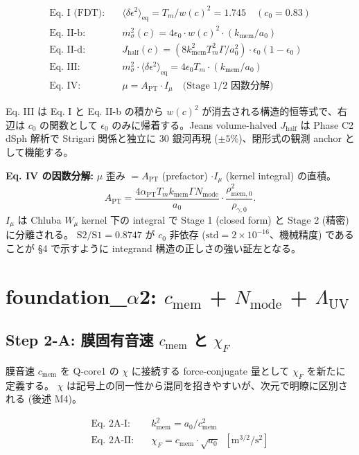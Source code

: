 \documentclass[11pt,a4paper]{ltjsarticle}
\newcommand{\epso}{\epsilon_0}
\newcommand{\kmem}{k_{\mathrm{mem}}}
\newcommand{\cmem}{c_{\mathrm{mem}}}
\newcommand{\Tm}{T_{m}}
\newcommand{\Nmode}{N_{\mathrm{mode}}}
\newcommand{\aPT}{\alpha_{\mathrm{PT}}}
\newcommand{\rhomem}{\rho_{\mathrm{mem},0}}
\newcommand{\rhog}{\rho_{\gamma,0}}
\newcommand{\Imu}{I_{\mu}}
\newcommand{\Wmu}{W_{\mu}}
\newcommand{\APT}{A_{\mathrm{PT}}}
\newcommand{\Lambdauv}{\Lambda_{\mathrm{UV}}}
\newcommand{\msigma}{m_{\sigma}}
\newcommand{\Jhalf}{J_{\mathrm{half}}}
\begin{document}
\begin{keybox}
\begin{align*}
\text{Eq. I (FDT):}\quad &\langle \delta\epsilon^2 \rangle_{\mathrm{eq}} = \Tm / w(c)^2 = 1.745 \quad (c_0 = 0.83) \\
\text{Eq. II-b:}\quad &\msigma^2(c) = 4\epso \cdot w(c)^2 \cdot (\kmem / a_0) \\
\text{Eq. II-d:}\quad &\Jhalf(c) = (8\kmem^2 \Tm^2 \Gamma / a_0^2) \cdot \epso(1 - \epso) \\
\text{Eq. III:}\quad &\msigma^2 \cdot \langle \delta\epsilon^2 \rangle_{\mathrm{eq}} = 4\epso\Tm \cdot (\kmem / a_0) \\
\text{Eq. IV:}\quad &\mu = \APT \cdot \Imu \quad \text{(Stage 1/2 因数分解)}
\end{align*}
\end{keybox}

Eq. III は Eq. I と Eq. II-b の積から $w(c)^2$ が消去される構造的恒等式で、右辺は $c_0$ の関数として
$\epso$ のみに帰着する。Jeans volume-halved $\Jhalf$ は Phase C2 dSph 解析で Strigari 関係と独立に
30 銀河再現 ($\pm 5\%$)、閉形式の観測 anchor として機能する。

\medskip\noindent
\textbf{Eq. IV の因数分解:}
$\mu$ 歪み $= \APT$ (prefactor) $\cdot \Imu$ (kernel integral) の直積。
\[
\APT = \frac{4\aPT \Tm \kmem \Gamma \Nmode}{a_0} \cdot \frac{\rhomem^2}{\rhog}.
\]
$\Imu$ は Chluba $\Wmu$ kernel 下の integral で Stage 1 (closed form) と Stage 2 (精密) に分離される。
$\mathrm{S2/S1} = 0.8747$ が $c_0$ 非依存 ($\mathrm{std} = 2 \times 10^{-16}$、機械精度) であることが
\S 4 で示すように integrand 構造の正しさの強い証左となる。

\section{foundation\_$\alpha$2: $\cmem$ + $\Nmode$ + $\Lambdauv$}

\subsection{Step 2-A: 膜固有音速 $\cmem$ と $\chi_F$}
膜音速 $\cmem$ を Q-core1 の $\chi$ に接続する force-conjugate 量として $\chi_F$ を新たに定義する。
$\chi$ は記号上の同一性から混同を招きやすいが、次元で明瞭に区別される (後述 M4)。

\begin{keybox}
\begin{align*}
\text{Eq. 2A-I:}\quad &\kmem^2 = a_0 / \cmem^2 \\
\text{Eq. 2A-II:}\quad &\chi_F = \cmem \cdot \sqrt{a_0}\;\; [\mathrm{m}^{3/2}/\mathrm{s}^2]
\end{align*}
\end{keybox}
\end{document}
